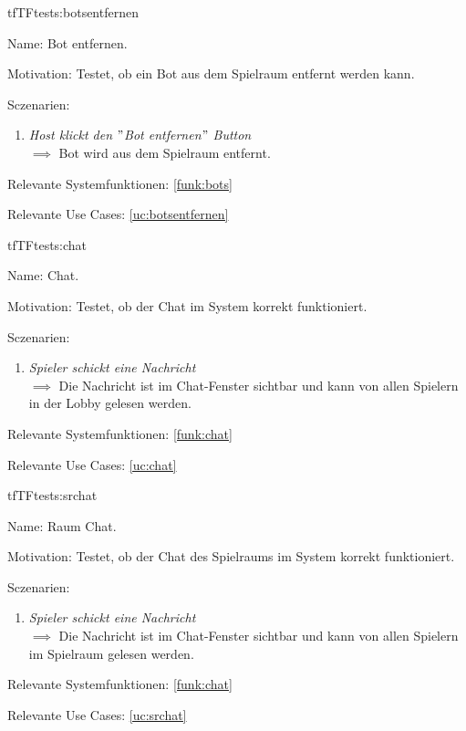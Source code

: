 \begin{description}[leftmargin=5em, style=sameline]
\begin{lhp}{tf}{TF}{tests:botsentfernen}
	\item [Name:] Bot entfernen.
	\item [Motivation:] Testet, ob ein Bot aus dem Spielraum entfernt werden kann.
	\item [Sczenarien:] \hfill
		\begin{enumerate}
			\item \textit{Host klickt den $"$Bot entfernen$"$ Button} \\ $\implies$ Bot wird aus dem Spielraum entfernt.
		\end{enumerate}
	\item [Relevante Systemfunktionen:] \ref{funk:bots}
	\item [Relevante Use Cases:] \ref{uc:botsentfernen}
\end{lhp}


\begin{lhp}{tf}{TF}{tests:chat}
	\item [Name:] Chat.
	\item [Motivation:] Testet, ob der Chat im System korrekt funktioniert.
	\item [Sczenarien:] \hfill
		\begin{enumerate}
			\item \textit{Spieler schickt eine Nachricht} \\ $\implies$ Die Nachricht ist im Chat-Fenster sichtbar und kann von allen Spielern in der Lobby gelesen werden.
		\end{enumerate}
	\item [Relevante Systemfunktionen:] \ref{funk:chat}
	\item [Relevante Use Cases:] \ref{uc:chat}
\end{lhp}

\begin{lhp}{tf}{TF}{tests:srchat}
	\item [Name:] Raum Chat.
	\item [Motivation:] Testet, ob der Chat des Spielraums im System korrekt funktioniert.
	\item [Sczenarien:] \hfill
		\begin{enumerate}
			\item \textit{Spieler schickt eine Nachricht} \\ $\implies$ Die Nachricht ist im Chat-Fenster sichtbar und kann von allen Spielern im Spielraum gelesen werden.
		\end{enumerate}
	\item [Relevante Systemfunktionen:] \ref{funk:chat}
	\item [Relevante Use Cases:] \ref{uc:srchat}
\end{lhp}


\end{description}
